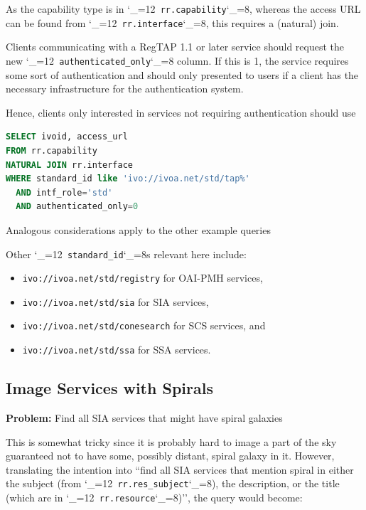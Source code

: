 \documentclass[11pt,a4paper]{ivoa}
\makeatletter
\def\rtent#1{\texttt{\color{rtcolor}\verb|#1|}}
\def\makeunderscoreletter{\catcode`\_=12}
\def\makeunderscoresubscript{\catcode`\_=8}
\def\rtent{\makeunderscoreletter\relax\rt@nt}
\def\rt@nt#1{\texttt{\color{rtcolor} #1}\makeunderscoresubscript{}}
\makeatother
\begin{document}
As the capability type is in
\rtent{rr.capability}, whereas the access URL can be
found from
\rtent{rr.interface}, this requires
a (natural) join.

Clients communicating with a RegTAP 1.1 or later service should request the new
\rtent{authenticated_only} column.  If this is 1, the service
requires some sort of authentication and should only presented to users
if a client has the necessary infrastructure for the authentication
system.

Hence, clients only interested in services not requiring authentication should
use

\begin{lstlisting}[language=SQL,flexiblecolumns=true]
SELECT ivoid, access_url
FROM rr.capability
NATURAL JOIN rr.interface
WHERE standard_id like 'ivo://ivoa.net/std/tap%'
  AND intf_role='std'
  AND authenticated_only=0
\end{lstlisting}

Analogous considerations apply to the other example queries

Other \rtent{standard_id}s relevant here include:


\begin{itemize}

\item \texttt{ivo://ivoa.net/std/registry} for OAI-PMH services,{}

\item \texttt{ivo://ivoa.net/std/sia} for SIA services,{}

\item \texttt{ivo://ivoa.net/std/conesearch} for SCS services,
and{}

\item \texttt{ivo://ivoa.net/std/ssa} for SSA services.{}

\end{itemize}

\subsection{Image Services with Spirals}

\textbf{Problem:} Find all SIA services that might have spiral
galaxies

This is somewhat tricky since it is probably hard to image a part
of the sky guaranteed not to have some, possibly distant, spiral galaxy
in it.  However, translating the intention into ``find all SIA services
that mention spiral in either the subject (from
\rtent{rr.res_subject}), the description, or the
title (which are in
\rtent{rr.resource})'',
the query would become:
\end{document}
